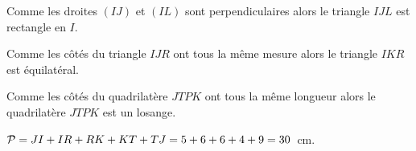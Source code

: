 \par{}
\begin{myenumerate}
  \item Comme les droites $(IJ)$ et $(IL)$ sont perpendiculaires alors
    le triangle $IJL$ est rectangle en $I$.\par Comme les côtés du
    triangle $IJR$ ont tous la même mesure alors le triangle $IKR$ est
    équilatéral.\par Comme les côtés du quadrilatère $JTPK$ ont tous
    la même longueur alors le quadrilatère $JTPK$ est un losange.
  \item ${\cal P}=JI+IR+RK+KT+TJ=5+6+6+4+9=30$~cm.
\end{myenumerate}